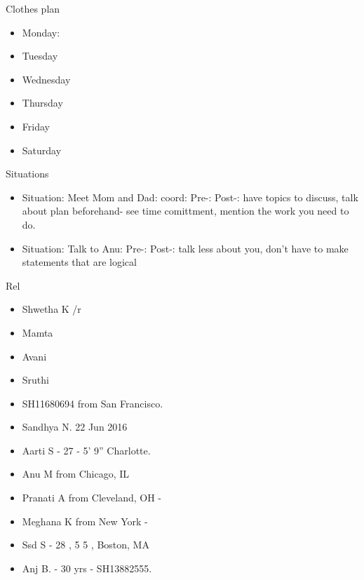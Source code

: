 \documentclass[serif, mathserif, final]{beamer}
\begin{document}
\begin{frame}
\begin{columns}
\begin{column}{0.25\linewidth}
  \begin{block}{Clothes plan} 
    \begin{itemize}
      \tiny \item \tiny Monday: 
    \item \tiny Tuesday
    \item \tiny Wednesday
    \item \tiny Thursday
    \item \tiny Friday
    \item \tiny Saturday
    \end{itemize} 
  \end{block}
  
      \begin{block}{Situations}
        \begin{itemize}
          \tiny \item \tiny Situation: Meet Mom and Dad:  coord:
          Pre-:  Post-: have topics to discuss, talk about plan
          beforehand- see time comittment, mention the work you need
          to do.

        \item \tiny Situation: Talk to Anu:  Pre-:   Post-:  talk less
          about you, don't have to make statements that are logical 

        \end{itemize} 
      \end{block} 

\begin{block}{Rel} 
  \begin{itemize} 
  \small \item \small Shwetha K /r
    \item \small Mamta
    \item \small Avani 
    \item \small Sruthi 
    \item \small SH11680694 from San Francisco. 
    \item \small Sandhya N. 22 Jun 2016 
    \item \small Aarti S - 27 - 5' 9'' Charlotte.       
    \item \small Anu M from Chicago, IL 
    \item \small Pranati A from Cleveland, OH - 
    \item \small Meghana K from New York - 
    \item \small Ssd S - 28 , 5 5 , Boston, MA 
    \item \small Anj B. - 30 yrs - SH13882555.
  \end{itemize}
\end{block}


\end{column}
\end{columns}
\end{frame}
\end{document}
